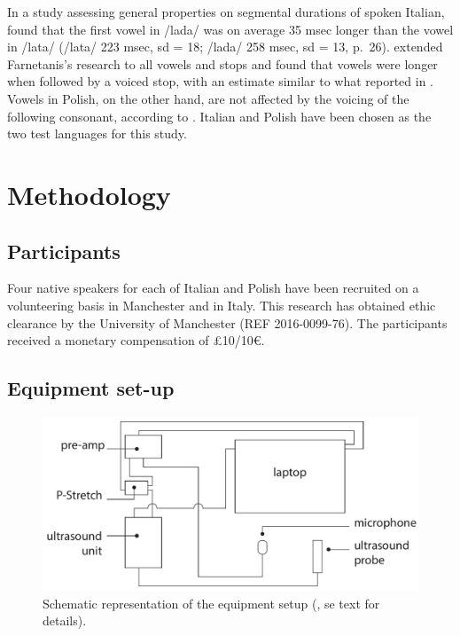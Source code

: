 \documentclass[authoryear, twocolumn]{elsarticle}
\newcommand{\euro}{€}
\begin{document}
In a study assessing general properties on segmental durations of spoken
Italian, \citet{farnetani1986} found that the first vowel in /lada/ was
on average 35 msec longer than the vowel in /lata/ (/lata/ 223 msec, sd
= 18; /lada/ 258 msec, sd = 13, p.~26). \citet{esposito2002} extended
Farnetanis's research to all vowels and stops and found that vowels were
longer when followed by a voiced stop, with an estimate similar to what
reported in \citet{farnetani1986}. Vowels in Polish, on the other hand,
are not affected by the voicing of the following consonant, according to
\citet{keating1984}. Italian and Polish have been chosen as the two test
languages for this study.

\section{Methodology}\label{methodology}

\subsection{Participants}\label{participants}

Four native speakers for each of Italian and Polish have been recruited
on a volunteering basis in Manchester and in Italy. This research has
obtained ethic clearance by the University of Manchester (REF
2016-0099-76). The participants received a monetary compensation of
£10/10\euro{}.

\subsection{Equipment set-up}\label{equipment-set-up}

\begin{figure}
\centering
\includegraphics[width=\textwidth]{../../graphics/uti-setup.pdf}
\caption{Schematic representation of the equipment setup
(\citealt{articulate2011}, se text for details).\label{f:uti-setup}}
\end{figure}
\end{document}
